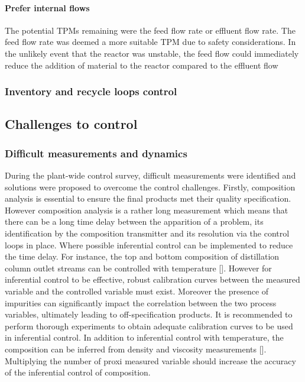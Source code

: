 \paragraph{Prefer internal flows}
The potential TPMs remaining were the feed flow rate or effluent flow rate. The feed flow rate was deemed a more suitable TPM due to safety considerations. In the unlikely event that the reactor was unstable, the feed flow could immediately reduce the addition of material to the reactor compared to the effluent flow


\subsubsection{Inventory and recycle loops control}




\subsection{Challenges to control}%

\subsubsection{Difficult measurements and dynamics} %
During the plant-wide control survey, difficult measurements were identified and solutions were proposed to overcome the control challenges. Firstly, composition analysis is essential to ensure the final products met their quality specification. However composition analysis is a rather long measurement which means that there can be a long time delay between the apparition of a problem, its identification by the composition transmitter and its resolution via the control loops in place. Where possible inferential control can be implemented to reduce the time delay. For instance, the top and bottom composition of distillation column outlet streams can be controlled with temperature []. However for inferential control to be effective, robust calibration curves between the measured variable and the controlled variable must exist. Moreover the presence of impurities can significantly impact the correlation between the two process variables, ultimately leading to off-specification products. It is recommended to perform thorough experiments to obtain adequate calibration curves to be used in inferential control. In addition to inferential control with temperature, the composition can be inferred from density and viscosity measurements []. Multiplying the number of proxi measured variable should increase the accuracy of the inferential control of composition.

